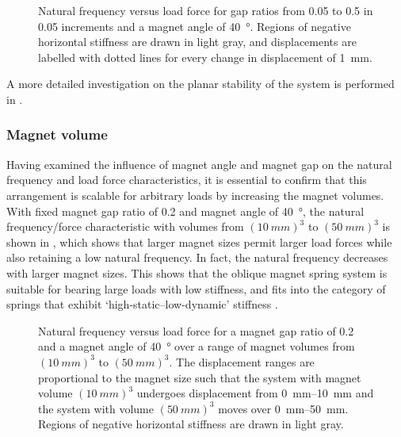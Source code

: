 \begin{figure}
\centering
{}
\caption{Natural frequency versus load force for gap ratios from \num{0.05} to \num{0.5} in \num{0.05} increments and a magnet angle of \SI{40}{\degree}.
Regions of negative horizontal stiffness are drawn in light gray, and displacements are labelled with dotted lines for every change in displacement of \SI{1}{mm}.}
\end{figure}

A more detailed investigation on the planar stability of the system is performed in .


\subsubsection{Magnet volume}

Having examined the influence of magnet angle and magnet gap on the natural frequency and load force characteristics, it is essential to confirm that this arrangement is scalable for arbitrary loads by increasing the magnet volumes.
With fixed magnet gap ratio of 0.2 and magnet angle of \SI{40}{\degree}, the natural frequency/force characteristic with volumes from $(\SI{10}{mm})^3$ to $(\SI{50}{mm})^3$ is shown in , which shows that larger magnet sizes permit larger load forces while also retaining a low natural frequency.
In fact, the natural frequency decreases with larger magnet sizes.
This shows that the oblique magnet spring system is suitable for bearing large loads with low stiffness, and fits into the category of springs that exhibit `high-static--low-dynamic' stiffness \parencite[e.g.,][]{carrella2008-jsv}.

\begin{figure}
\centering
{}
\caption{Natural frequency versus load force for a magnet gap ratio of \num{0.2} and a magnet angle of \SI{40}{\degree} over a range of magnet volumes from $(\SI{10}{mm})^3$ to $(\SI{50}{mm})^3$.
The displacement ranges are proportional to the magnet size such that the system with magnet volume $(\SI{10}{mm})^3$ undergoes displacement from \SIrange{0}{10}{mm} and the system with volume $(\SI{50}{mm})^3$ moves over \SIrange{0}{50}{mm}.
Regions of negative horizontal stiffness are drawn in light gray.}
\end{figure}

